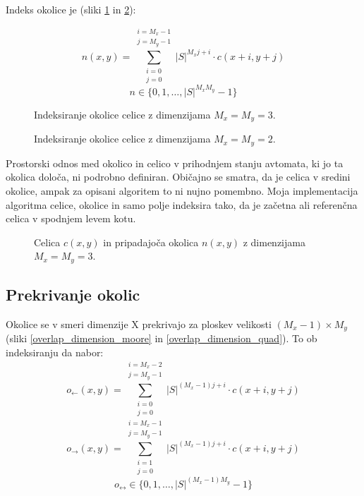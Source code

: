 \documentclass[12pt,a4paper,openany,twoside]{book}
\begin{document}
Indeks okolice je (sliki \ref{neighborhood_index_moore} in \ref{neighborhood_index_quad}):

\begin{equation}
n(x,y) = \sum_{\substack{i=0 \\ j=0}}^{\substack{i=M_x-1 \\ j=M_y-1}} |S|^{M_x j + i} \cdot c(x+i,y+j)
\end{equation}
\begin{equation}
n \in \{0, 1, \ldots, |S|^{M_x M_y}-1\}
\end{equation}

\begin{figure}[htb]
\centerline{}
\caption[Indeksiranje okolice \(3 \times 3\).]{Indeksiranje okolice celice z dimenzijama \(M_x=M_y=3\).}
\label{neighborhood_index_moore}
\end{figure}

\begin{figure}[htb]
\centerline{}
\caption[Indeksiranje okolice \(2 \times 2\).]{Indeksiranje okolice celice z dimenzijama \(M_x=M_y=2\).}
\label{neighborhood_index_quad}
\end{figure}

Prostorski odnos med okolico in celico v prihodnjem stanju avtomata, ki jo ta okolica določa,
ni podrobno definiran. Običajno se smatra, da je celica v sredini okolice, ampak za opisani algoritem to ni
nujno pomembno. Moja implementacija algoritma celice, okolice in samo polje indeksira tako,
da je začetna ali referenčna celica v spodnjem levem kotu.

\begin{figure}[htb]
\centerline{}
\caption[Velikost okolice.]{Celica \(c(x,y)\) in pripadajoča okolica \(n(x,y)\) z dimenzijama \(M_x=M_y=3\).}
\label{neighborhood}
\end{figure}

\subsection{Prekrivanje okolic}

Okolice se v smeri dimenzije X prekrivajo za ploskev velikosti \((M_x-1) \times M_y\) (sliki \ref{overlap_dimension_moore} in \ref{overlap_dimension_quad}).
To ob indeksiranju da nabor:
\begin{equation}
o_{\leftarrow}(x,y) = \sum_{\substack{i=0 \\ j=0}}^{\substack{i=M_x-2 \\ j=M_y-1}} |S|^{(M_x-1) j + i} \cdot c(x+i,y+j)
\end{equation}
\begin{equation}
o_{\rightarrow}(x,y) = \sum_{\substack{i=1 \\ j=0}}^{\substack{i=M_x-1 \\ j=M_y-1}} |S|^{(M_x-1) j + i} \cdot c(x+i,y+j)
\end{equation}
\begin{equation}
o_{\leftrightarrow} \in \{0, 1, \ldots, |S|^{(M_x-1)M_y}-1\}
\end{equation}
\end{document}
